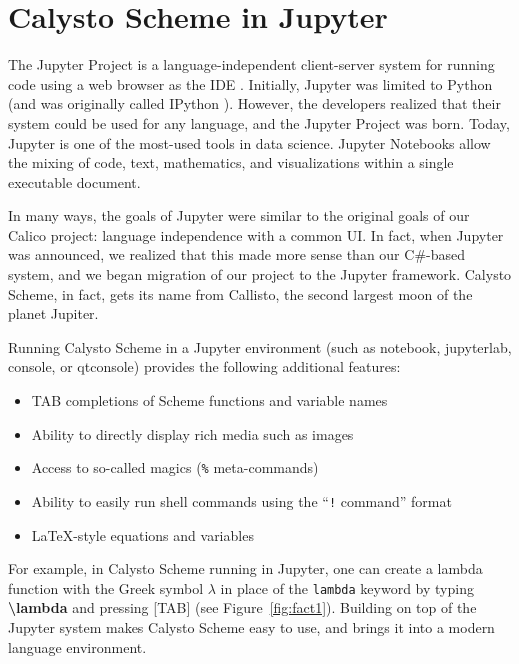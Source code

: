 \documentclass[acmsmall,screen,authorversion]{acmart}
\begin{document}

\section{Calysto Scheme in Jupyter}

The Jupyter Project is a language-independent client-server system for
running code using a web browser as the IDE
\cite{Kluyver2016jupyter}. Initially, Jupyter was limited to Python
(and was originally called IPython \cite{PER-GRA:2007}). However, the
developers realized that their system could be used for any language,
and the Jupyter Project was born. Today, Jupyter is one of the
most-used tools in data science. Jupyter Notebooks allow the mixing of
code, text, mathematics, and visualizations within a single executable
document.

In many ways, the goals of Jupyter were similar to the original goals of our
Calico project: language independence with a common UI. In fact, when Jupyter
was announced, we realized that this made more sense than our C\#-based system,
and we began migration of our project to the Jupyter framework. Calysto Scheme,
in fact, gets its name from Callisto, the second largest moon of the planet
Jupiter.

Running Calysto Scheme in a Jupyter environment (such as notebook, jupyterlab,
console, or qtconsole) provides the following additional features:

\begin{itemize}
\item TAB completions of Scheme functions and variable names
\item Ability to directly display rich media such as images
\item Access to so-called magics (\texttt{\%} meta-commands)
\item Ability to easily run shell commands using the ``\texttt{!} command'' format
\item \LaTeX-style equations and variables
\end{itemize}

For example, in Calysto Scheme running in Jupyter, one can create a lambda
function with the Greek symbol $\lambda$ in place of the \texttt{lambda}
keyword by typing \textbf{\textbackslash lambda} and pressing [TAB] (see
Figure~\ref{fig:fact1}). Building on top of the Jupyter system makes Calysto
Scheme easy to use, and brings it into a modern language environment.
\end{document}
